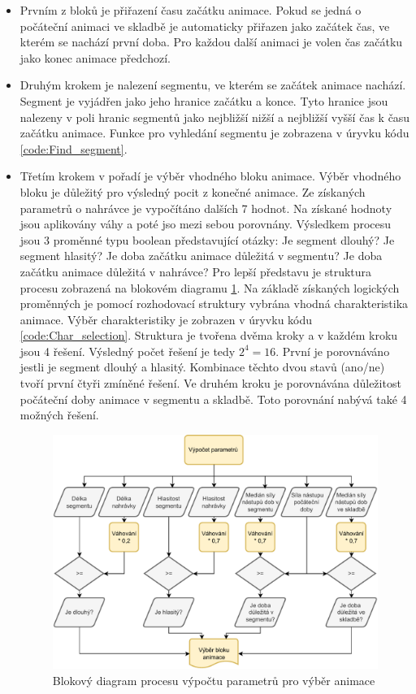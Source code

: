 \begin{itemize}
    \item  
    Prvním z bloků je přiřazení času začátku animace. Pokud se jedná o počáteční animaci ve skladbě je automaticky přiřazen jako začátek čas, ve kterém se nachází první doba. Pro každou další animaci je volen čas začátku jako konec animace předchozí. 
    \item 
    Druhým krokem je nalezení segmentu, ve kterém se začátek animace nachází. Segment je vyjádřen jako jeho hranice začátku a konce. Tyto hranice jsou nalezeny v poli hranic segmentů jako nejbližší nižší a nejbližší vyšší čas k času začátku animace. Funkce pro vyhledání segmentu je zobrazena v úryvku kódu \ref{code:Find_segment}. 

    \item 
    Třetím krokem v pořadí je výběr vhodného bloku animace. Výběr vhodného bloku je důležitý pro výsledný pocit z konečné animace. Ze získaných parametrů o nahrávce je vypočítáno dalších 7 hodnot. Na získané hodnoty jsou aplikovány váhy a poté jso mezi sebou porovnány. Výsledkem procesu jsou 3 proměnné typu boolean představující otázky: Je segment dlouhý? Je segment hlasitý? Je doba začátku animace důležitá v segmentu? Je doba začátku animace důležitá v nahrávce? Pro lepší představu je struktura procesu zobrazená na blokovém diagramu \ref{fig:Anim_block_param_selection_diagram}. Na základě získaných logických proměnných je pomocí rozhodovací struktury vybrána vhodná charakteristika animace. Výběr charakteristiky je zobrazen v úryvku kódu \ref{code:Char_selection}. Struktura je tvořena dvěma kroky a v každém kroku jsou 4 řešení. Výsledný počet řešení je tedy $2^4 = 16$. První je porovnáváno jestli je segment dlouhý a hlasitý. Kombinace těchto dvou stavů (ano/ne) tvoří první čtyři zmíněné řešení. Ve druhém kroku je porovnávána důležitost počáteční doby animace v segmentu a skladbě. Toto porovnání nabývá také 4 možných řešení.  

    \begin{figure}[H]
        \centering
        \includegraphics[width = 1\linewidth]{obrazky/UML_diagramy_anim_bock_selection _part_1.pdf}
        \caption{Blokový diagram procesu výpočtu parametrů pro výběr animace}
        \label{fig:Anim_block_param_selection_diagram}
    \end{figure}


\end{itemize}
